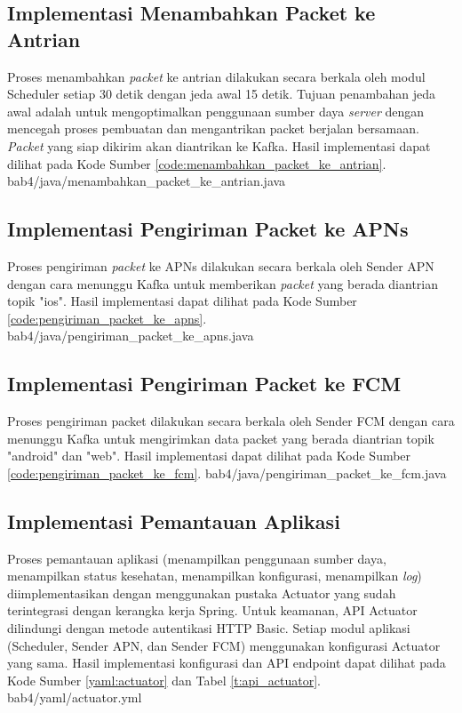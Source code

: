 \subsection{Implementasi Menambahkan Packet ke Antrian}
\par Proses menambahkan \textit{packet} ke antrian dilakukan secara berkala oleh modul Scheduler setiap 30 detik dengan jeda awal 15 detik. Tujuan penambahan jeda awal adalah untuk mengoptimalkan penggunaan sumber daya \textit{server} dengan mencegah proses pembuatan dan mengantrikan packet berjalan bersamaan. \textit{Packet} yang siap dikirim akan diantrikan ke Kafka. Hasil implementasi dapat dilihat pada Kode Sumber \ref{code:menambahkan_packet_ke_antrian}.
 {bab4/java/menambahkan_packet_ke_antrian.java}

\subsection{Implementasi Pengiriman Packet ke APNs}
\par Proses pengiriman \textit{packet} ke APNs dilakukan secara berkala oleh Sender APN dengan cara menunggu Kafka untuk memberikan \textit{packet} yang berada diantrian topik "ios". Hasil implementasi dapat dilihat pada Kode Sumber \ref{code:pengiriman_packet_ke_apns}.
 {bab4/java/pengiriman_packet_ke_apns.java}

\subsection{Implementasi Pengiriman Packet ke FCM}
\par Proses pengiriman packet dilakukan secara berkala oleh Sender FCM dengan cara menunggu Kafka untuk mengirimkan data packet yang berada diantrian topik "android" dan "web". Hasil implementasi dapat dilihat pada Kode Sumber \ref{code:pengiriman_packet_ke_fcm}.
 {bab4/java/pengiriman_packet_ke_fcm.java}

\subsection{Implementasi Pemantauan Aplikasi}
\par Proses pemantauan aplikasi (menampilkan penggunaan sumber daya, menampilkan status kesehatan, menampilkan konfigurasi, menampilkan \textit{log}) diimplementasikan dengan menggunakan pustaka Actuator yang sudah terintegrasi dengan kerangka kerja Spring. Untuk keamanan, API Actuator dilindungi dengan metode autentikasi HTTP Basic. Setiap modul aplikasi (Scheduler, Sender APN, dan Sender FCM) menggunakan konfigurasi Actuator yang sama. Hasil implementasi konfigurasi dan API endpoint dapat dilihat pada Kode Sumber \ref{yaml:actuator} dan Tabel \ref{t:api_actuator}.
 {bab4/yaml/actuator.yml}

